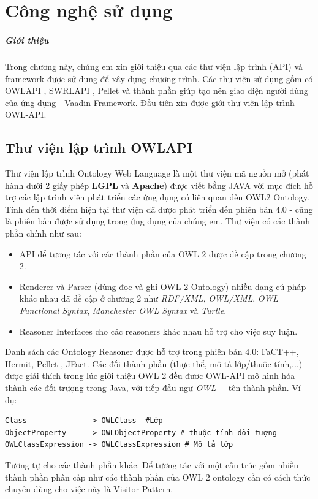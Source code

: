 \chapter{Công nghệ sử dụng}
\paragraph{Giới thiệu} Trong chương này, chúng em xin giới thiệu qua các thư viện lập trình (API) và framework được sử dụng để xây dựng chương trình. Các thư viện sử dụng gồm có OWLAPI \cite{owlapi}, SWRLAPI \cite{swrlapi}, Pellet \cite{pellet} và thành phần giúp tạo nên giao diện người dùng của ứng dụng - Vaadin Framework. Đầu tiên xin được giới thư viện lập trình OWL-API.
\section{Thư viện lập trình OWLAPI}
Thư viện lập trình Ontology Web Language là một thư viện mã nguồn mở (phát hành dưới 2 giấy phép \textbf{LGPL} và \textbf{Apache}) \cite{owlapi} được viết bằng JAVA với mục đích hỗ trợ các lập trình viên phát triển các ứng dụng có liên quan đến OWL2 Ontology. Tính đến thời điểm hiện tại thư viện đã được phát triển đến phiên bản 4.0 - cũng là phiên bản được sử dụng trong ứng dụng của chúng em.
Thư viện có các thành phần chính như sau: 
\begin{itemize}
	\item API để tương tác với các thành phần của OWL 2 được đề cập trong chương 2.
	\item Renderer và Parser (dùng đọc và ghi OWL 2 Ontology) nhiều dạng cú pháp khác nhau đã đề cập ở chương 2 như \textit{RDF/XML}, \textit{OWL/XML}, \textit{OWL Functional Syntax}, \textit{Manchester OWL Syntax} và \textit{Turtle}.
	\item Reasoner Interfaces cho các reasoners khác nhau hỗ trợ cho việc suy luận.
\end{itemize}
Danh sách các Ontology Reasoner được hỗ trợ trong phiên bản 4.0: FaCT++, Hermit, Pellet \cite{pellet}, JFact.
Các đối thành phần (thực thể, mô tả lớp/thuộc tính,...) được giải thích trong lúc giới thiệu OWL 2 đều đươc OWL-API mô hình hóa thành các đối trượng trong Java, với tiếp đầu ngữ \textit{OWL} + tên thành phần. Ví dụ:
\begin{verbatim}
Class              -> OWLClass  #Lớp
ObjectProperty     -> OWLObjectProperty # thuộc tính đối tượng
OWLClassExpression -> OWLClassExpression # Mô tả lớp
\end{verbatim} 
Tương tự cho các thành phần khác. Để tương tác với một cấu trúc gồm nhiều thành phần phân cấp như các thành phần của OWL 2 ontology cần có cách thức chuyên dùng cho việc này là Visitor Pattern.
